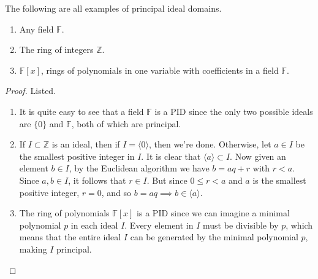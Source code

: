   \begin{theorem}
    The following are all examples of principal ideal domains. 
    \begin{enumerate}
      \item Any field $\mathbb{F}$. 
      \item The ring of integers $\mathbb{Z}$. 
      \item $\mathbb{F}[x]$, rings of polynomials in one variable with coefficients in a field $\mathbb{F}$. 
    \end{enumerate}
  \end{theorem}
  \begin{proof}
    Listed. 
    \begin{enumerate}
      \item It is quite easy to see that a field $\mathbb{F}$ is a PID since the only two possible ideals are $\{0\}$ and $\mathbb{F}$, both of which are principal. 
      \item If $I \subset \mathbb{Z}$ is an ideal, then if $I = \langle 0 \rangle$, then we're done. Otherwise, let $a \in I$ be the smallest positive integer in $I$. It is clear that $\langle a \rangle \subset I$. Now given an element $b \in I$, by the Euclidean algorithm we have $b = aq + r$ with $r < a$. Since $a, b \in I$, it follows that $r \in I$. But since $0 \leq r < a$ and $a$ is the smallest positive integer, $r = 0$, and so $b = aq \implies b \in \langle a \rangle$. 
      \item The ring of polynomials $\mathbb{F}[x]$ is a PID since we can imagine a minimal polynomial $p$ in each ideal $I$. Every element in $I$ must be divisible by $p$, which means that the entire ideal $I$ can be generated by the minimal polynomial $p$, making $I$ principal.  
    \end{enumerate}
  \end{proof}


